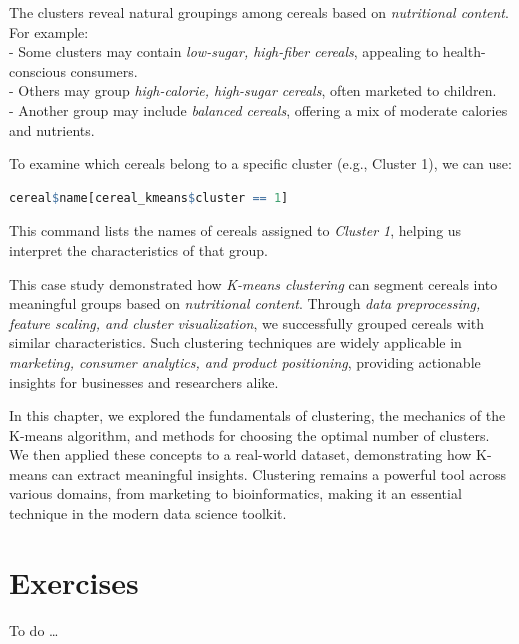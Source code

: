 \documentclass[
]{book}
\theoremstyle{definition}
\theoremstyle{definition}
\theoremstyle{definition}
\theoremstyle{definition}
\theoremstyle{remark}
\begin{document}
The clusters reveal natural groupings among cereals based on \emph{nutritional content}. For example:\\
- Some clusters may contain \emph{low-sugar, high-fiber cereals}, appealing to health-conscious consumers.\\
- Others may group \emph{high-calorie, high-sugar cereals}, often marketed to children.\\
- Another group may include \emph{balanced cereals}, offering a mix of moderate calories and nutrients.

To examine which cereals belong to a specific cluster (e.g., Cluster 1), we can use:

\begin{lstlisting}[language=R]
cereal$name[cereal_kmeans$cluster == 1]
\end{lstlisting}

This command lists the names of cereals assigned to \emph{Cluster 1}, helping us interpret the characteristics of that group.

This case study demonstrated how \emph{K-means clustering} can segment cereals into meaningful groups based on \emph{nutritional content}. Through \emph{data preprocessing, feature scaling, and cluster visualization}, we successfully grouped cereals with similar characteristics. Such clustering techniques are widely applicable in \emph{marketing, consumer analytics, and product positioning}, providing actionable insights for businesses and researchers alike.

In this chapter, we explored the fundamentals of clustering, the mechanics of the K-means algorithm, and methods for choosing the optimal number of clusters. We then applied these concepts to a real-world dataset, demonstrating how K-means can extract meaningful insights. Clustering remains a powerful tool across various domains, from marketing to bioinformatics, making it an essential technique in the modern data science toolkit.

\section{Exercises}\label{exercises-8}

To do \ldots{}

  
\end{document}
